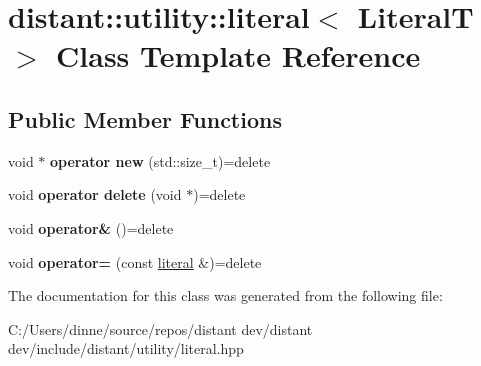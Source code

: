 \hypertarget{classdistant_1_1utility_1_1literal}{}\section{distant\+:\+:utility\+:\+:literal$<$ LiteralT $>$ Class Template Reference}
\label{classdistant_1_1utility_1_1literal}
\subsection*{Public Member Functions}
\begin{DoxyCompactItemize}
\item 
\mbox{\label{classdistant_1_1utility_1_1literal_a71180d2699c72362c9210d261fc7210e}} 
void $\ast$ {\bfseries operator new} (std\+::size\+\_\+t)=delete
\item 
\mbox{\label{classdistant_1_1utility_1_1literal_ad56dcf3bf89a82c6c9c7f6845a2fdcab}} 
void {\bfseries operator delete} (void $\ast$)=delete
\item 
\mbox{\label{classdistant_1_1utility_1_1literal_a66fbff5d5fb0600a3ae661168af86ed5}} 
void {\bfseries operator\&} ()=delete
\item 
\mbox{\label{classdistant_1_1utility_1_1literal_a42efe6ba50cd1acd57dbd1e50cf3d1e8}} 
void {\bfseries operator=} (const \mbox{\hyperlink{classdistant_1_1utility_1_1literal}{literal}} \&)=delete
\end{DoxyCompactItemize}


The documentation for this class was generated from the following file\+:\begin{DoxyCompactItemize}
\item 
C\+:/\+Users/dinne/source/repos/distant dev/distant dev/include/distant/utility/literal.\+hpp\end{DoxyCompactItemize}

